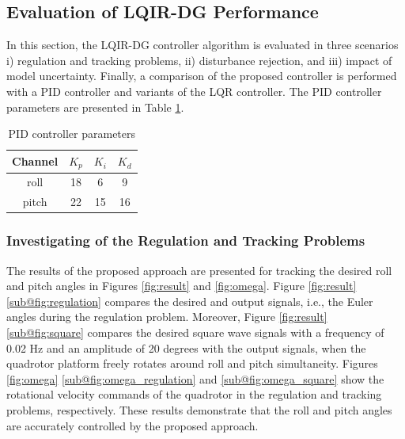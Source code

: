 \documentclass[peerreview]{IEEEtran}
\begin{document}
\subsection{Evaluation of LQIR-DG Performance}
\noindent In this section, the LQIR-DG controller algorithm is evaluated in three scenarios i) regulation and tracking problems, ii) disturbance rejection, and iii) impact of model uncertainty.
Finally, a comparison of the proposed controller is performed with a PID controller and variants of the LQR controller. 
The PID controller parameters are presented in Table \ref{tab:PID_parameters}.
\begin{table}[H]
	\renewcommand{\arraystretch}{1.3}
	\caption{PID controller parameters}
	\begin{center}
		\begin{tabular}{cccc}
		\hline
		\textbf{Channel} & \textbf{$K_p$} & \textbf{$K_i$} & \textbf{$K_d$} \\
		\hline
		roll & 18 & 6 & 9 \\
		pitch & 22 & 15 & 16 \\
		\hline
		\end{tabular}
		\label{tab:PID_parameters}
	\end{center}
\end{table}
\subsubsection{Investigating of the Regulation and Tracking Problems}\label{sec:regulation}
\noindent The results of the proposed approach are presented for tracking the desired roll and pitch angles in Figures \ref{fig:result} and \ref{fig:omega}.
Figure \ref{fig:result} \ref{sub@fig:regulation} compares the desired and output signals, i.e., the Euler angles during the regulation problem. Moreover, Figure \ref{fig:result} \ref{sub@fig:square} compares the desired square wave signals with a frequency of 0.02 Hz and an amplitude of 20 degrees with the output signals, when the quadrotor platform freely rotates around roll and pitch simultaneity.
Figures \ref{fig:omega} \ref{sub@fig:omega_regulation} and \ref{sub@fig:omega_square} show the rotational velocity commands of the quadrotor in the regulation and tracking problems, respectively. These results demonstrate that the roll and pitch angles are accurately controlled by the proposed approach.
\end{document}

